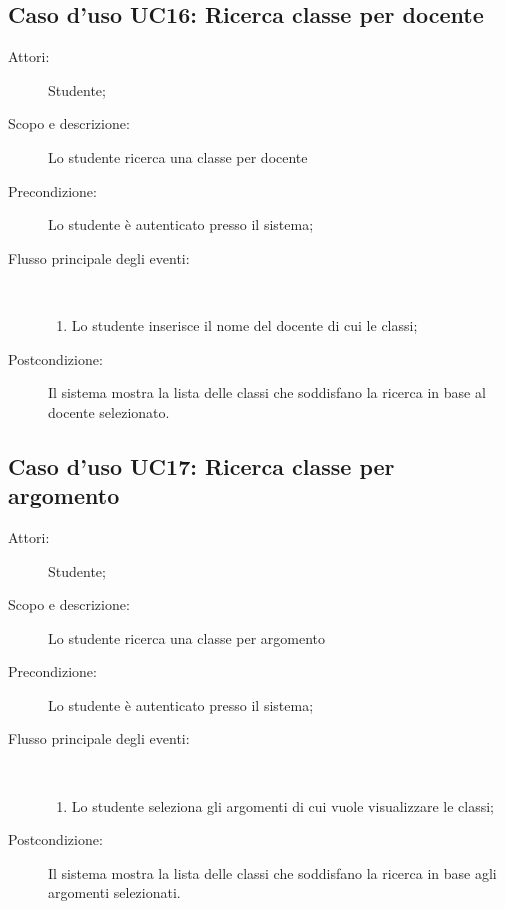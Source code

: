 \subsection{Caso d'uso UC16: Ricerca classe per docente}\begin{description}
\item[Attori:] Studente;
\item[Scopo e descrizione:] Lo studente ricerca una classe per docente
      \item[Precondizione:] Lo studente è autenticato presso il sistema;

        \item[Flusso principale degli eventi:] \ 
 \begin{enumerate}
          \item Lo studente inserisce il nome del docente di cui le classi;

      \end{enumerate}
    \item[Postcondizione:] Il sistema mostra la lista delle classi che soddisfano la ricerca in base al docente selezionato.
  \end{description}
\hypertarget{UC17}{}
\subsection{Caso d'uso UC17: Ricerca classe per argomento}\begin{description}
\item[Attori:] Studente;
\item[Scopo e descrizione:] Lo studente ricerca una classe per argomento
      \item[Precondizione:] Lo studente è autenticato presso il sistema;

        \item[Flusso principale degli eventi:] \ 
 \begin{enumerate}
          \item Lo studente seleziona gli argomenti di cui vuole visualizzare le classi;

      \end{enumerate}
    \item[Postcondizione:] Il sistema mostra la lista delle classi che soddisfano la ricerca in base agli argomenti selezionati.
  \end{description}
\hypertarget{UC18}{}
